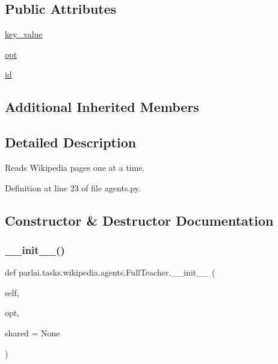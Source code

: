 \subsection*{Public Attributes}
\begin{DoxyCompactItemize}
\item 
\hyperlink{classparlai_1_1tasks_1_1wikipedia_1_1agents_1_1FullTeacher_ad868c50f3a789ce8f091605630b8f715}{key\+\_\+value}
\item 
\hyperlink{classparlai_1_1tasks_1_1wikipedia_1_1agents_1_1FullTeacher_aa4ceed492ea802e93be6cad4f5a7b322}{opt}
\item 
\hyperlink{classparlai_1_1tasks_1_1wikipedia_1_1agents_1_1FullTeacher_a336be0a2ec18a9d19fd58cc4031c30b6}{id}
\end{DoxyCompactItemize}
\subsection*{Additional Inherited Members}


\subsection{Detailed Description}
\begin{DoxyVerb}Reads Wikipedia pages one at a time.
\end{DoxyVerb}
 

Definition at line 23 of file agents.\+py.



\subsection{Constructor \& Destructor Documentation}
\mbox{\label{classparlai_1_1tasks_1_1wikipedia_1_1agents_1_1FullTeacher_a51b594b0d89c482575edc4ada9e1edcb}} 
\subsubsection{\texorpdfstring{\+\_\+\+\_\+init\+\_\+\+\_\+()}{\_\_init\_\_()}}
{\footnotesize\ttfamily def parlai.\+tasks.\+wikipedia.\+agents.\+Full\+Teacher.\+\_\+\+\_\+init\+\_\+\+\_\+ (\begin{DoxyParamCaption}\item[{}]{self,  }\item[{}]{opt,  }\item[{}]{shared = {\ttfamily None} }\end{DoxyParamCaption})}



